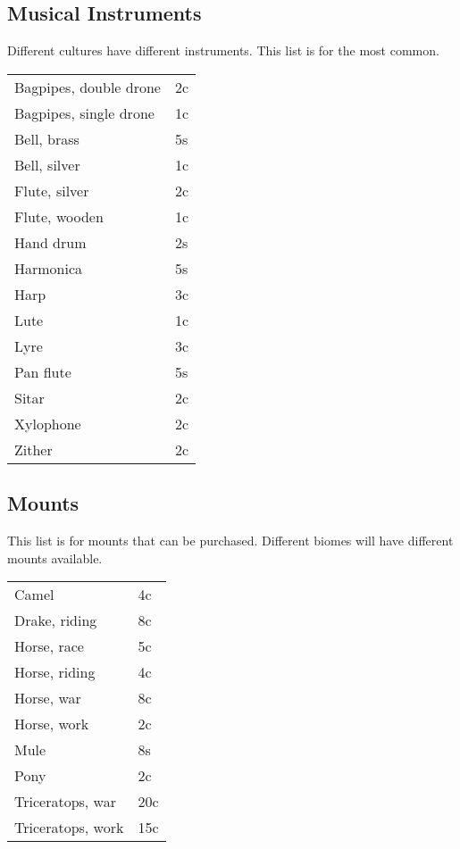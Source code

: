 \subsection{Musical Instruments}

Different cultures have different instruments. This list is for the most common.

\begin{center}
{
\begin{xtabular}{|l|l|}
Bagpipes, double drone & 2c \\
Bagpipes, single drone & 1c \\
Bell, brass & 5s \\
Bell, silver & 1c \\
Flute, silver & 2c \\
Flute, wooden & 1c \\
Hand drum & 2s \\
Harmonica & 5s \\
Harp & 3c \\
Lute & 1c \\
Lyre & 3c \\
Pan flute & 5s \\
Sitar & 2c \\
Xylophone & 2c \\
Zither & 2c \\
\hline
\end{xtabular}
}
\end{center}

\subsection{Mounts}

This list is for mounts that can be purchased. Different biomes will have different mounts available.

\begin{center}
{
\begin{xtabular}{|l|l|}
Camel & 4c \\
Drake, riding & 8c \\
Horse, race & 5c \\
Horse, riding & 4c \\
Horse, war & 8c \\
Horse, work & 2c \\
Mule & 8s \\
Pony & 2c \\
Triceratops, war & 20c \\
Triceratops, work & 15c \\
\hline
\end{xtabular}
}
\end{center}


